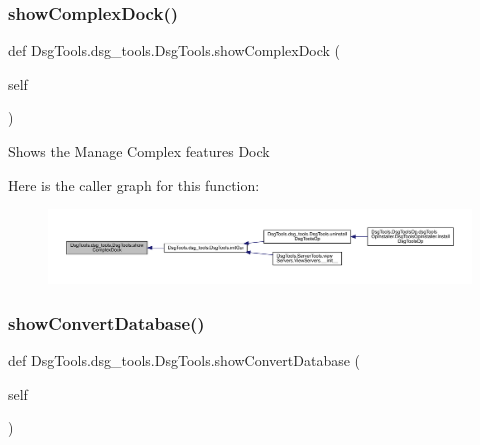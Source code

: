 \subsubsection{\texorpdfstring{show\+Complex\+Dock()}{showComplexDock()}}
{\footnotesize\ttfamily def Dsg\+Tools.\+dsg\+\_\+tools.\+Dsg\+Tools.\+show\+Complex\+Dock (\begin{DoxyParamCaption}\item[{}]{self }\end{DoxyParamCaption})}

\begin{DoxyVerb}Shows the Manage Complex features Dock
\end{DoxyVerb}
 Here is the caller graph for this function\+:
\nopagebreak
\begin{figure}[H]
\begin{center}
\leavevmode
\includegraphics[width=350pt]{class_dsg_tools_1_1dsg__tools_1_1_dsg_tools_a2a6302cf6e4fe28b23ffbf9ae6688f1c_icgraph}
\end{center}
\end{figure}
\mbox{\label{class_dsg_tools_1_1dsg__tools_1_1_dsg_tools_a81bc3b864b7a3db7781403ecda33b91d}} 
\subsubsection{\texorpdfstring{show\+Convert\+Database()}{showConvertDatabase()}}
{\footnotesize\ttfamily def Dsg\+Tools.\+dsg\+\_\+tools.\+Dsg\+Tools.\+show\+Convert\+Database (\begin{DoxyParamCaption}\item[{}]{self }\end{DoxyParamCaption})}

